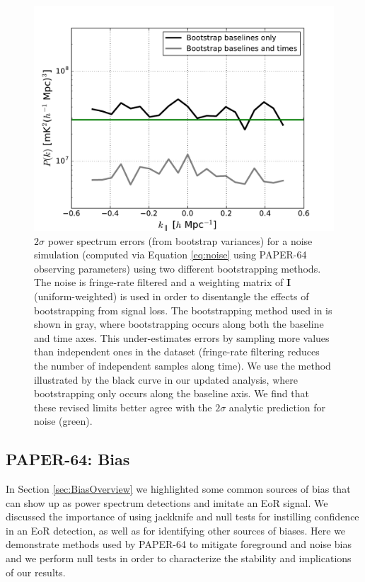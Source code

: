 \documentclass[preprint2,numberedappendix,tighten]{aastex6}  %
\begin{document}
\begin{figure}
	\centering
	\includegraphics[trim={0.3cm 0cm 0.3cm 0.3cm},width=\columnwidth]{plots/noise_errors.pdf}
	\caption{$2\sigma$ power spectrum errors (from bootstrap variances) for a noise simulation (computed via Equation \eqref{eq:noise} using PAPER-64 observing parameters) using two different bootstrapping 
methods. The noise is fringe-rate filtered and a weighting matrix of $\textbf{I}$ (uniform-weighted) is used in order to disentangle the 
effects of bootstrapping from signal loss. The bootstrapping method used in  is shown in gray, where bootstrapping occurs along both the baseline and time axes. This under-estimates errors by sampling more values than independent ones in the dataset (fringe-rate filtering reduces the number of independent samples along time). We use the method illustrated by the black curve in our updated analysis, where bootstrapping only occurs along the baseline axis. We find that these revised limits better agree with the $2\sigma$ analytic prediction for noise (green).}
	\label{fig:data_errors}
\end{figure}


\subsection{PAPER-64: Bias}
\label{sec:Bias}

In Section \ref{sec:BiasOverview} we highlighted some common sources of bias that can show up as power spectrum 
detections and imitate an EoR signal. We discussed the importance of using jackknife and null tests for instilling confidence in an EoR 
detection, as well as for identifying other sources of biases. Here we demonstrate methods used by PAPER-64 to mitigate 
foreground and noise bias and we perform null tests in order to characterize the stability and implications of our results.
\end{document}
